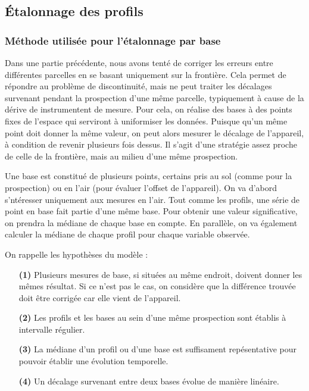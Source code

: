 \documentclass[12pt]{article}
\begin{document}
\newpage  
\subsection{Étalonnage des profils}\label{2-etal}
\subsubsection{Méthode utilisée pour l'étalonnage par base}

    \label{2_evol_base} Dans une partie précédente, nous avons tenté de corriger les erreurs entre différentes parcelles en se basant uniquement sur la frontière. Cela permet de répondre au problème de discontinuité, mais ne peut traiter les décalages survenant pendant la prospection d'une même parcelle, typiquement à cause de la dérive de instrumentent de mesure. Pour cela, on réalise des bases à des points fixes de l'espace qui serviront à uniformiser les données. Puisque qu'un même point doit donner la même valeur, on peut alors mesurer le décalage de l'appareil, à condition de revenir plusieurs fois dessus. Il s'agit d'une stratégie assez proche de celle de la frontière, mais au milieu d'une même prospection.

    Une base est constitué de plusieurs points, certains pris au sol (comme pour la prospection) ou en l'air (pour évaluer l'offset de l'appareil). On va d'abord s'ntéresser uniquement aux mesures en l'air. Tout comme les profils, une série de point en base fait partie d'une même base. Pour obtenir une valeur significative, on prendra la médiane de chaque base en compte. En parallèle, on va également calculer la médiane de chaque profil pour chaque variable observée.

    On rappelle les hypothèses du modèle :
    \begin{enumerate}
        \item[\textbf{(1)}] Plusieurs mesures de base, si situées au même endroit, doivent donner les mêmes résultat. Si ce n'est pas le cas, on considère que la différence trouvée doit être corrigée car elle vient de l'appareil.
        \item[\textbf{(2)}] Les profils et les bases au sein d'une même prospection sont établis à intervalle régulier.
        \item[\textbf{(3)}] La médiane d'un profil ou d'une base est suffisament repésentative pour pouvoir établir une évolution temporelle.
        \item[\textbf{(4)}] Un décalage survenant entre deux bases évolue de manière linéaire.
    \end{enumerate}
\end{document}
